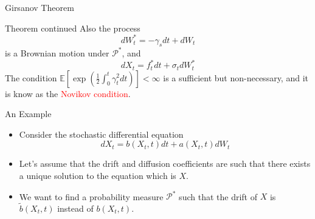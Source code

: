 \documentclass{beamer}
\begin{document}
\begin{frame}{Girsanov Theorem}
  \begin{block}{Theorem continued}
    Also the process
    \begin{equation}
      dW^*_t = -\gamma_s dt + dW_t
    \end{equation} 
    is a Brownian motion under $\mathcal{P}^*$, and 
    \begin{equation*}
      dX_t = f^*_t dt + \sigma_t dW^*_t
    \end{equation*}
    The condition $\mathbb{E}\left[\exp\left(\frac{1}{2}\int_0^t\gamma_t^2dt\right)\right]<\infty$ is a sufficient but non-necessary, and it is know as the \textcolor{red}{Novikov condition}.
  \end{block}
\end{frame}


\begin{frame}{An Example}
  \begin{itemize}
  \item Consider the stochastic differential equation
    \begin{equation*}
      dX_t = b(X_t, t) dt + a(X_t, t) dW_t
    \end{equation*}
  \item Let's assume that the drift and diffusion coefficients are such that there exists a unique solution to the equation which is $X$.
  \item We want to find a probability measure $\mathcal{P}^*$ such that the drift of $X$ is $\tilde{b}(X_t,t)$ instead of $b(X_t,t)$.
  \end{itemize}
\end{frame}
\end{document}
